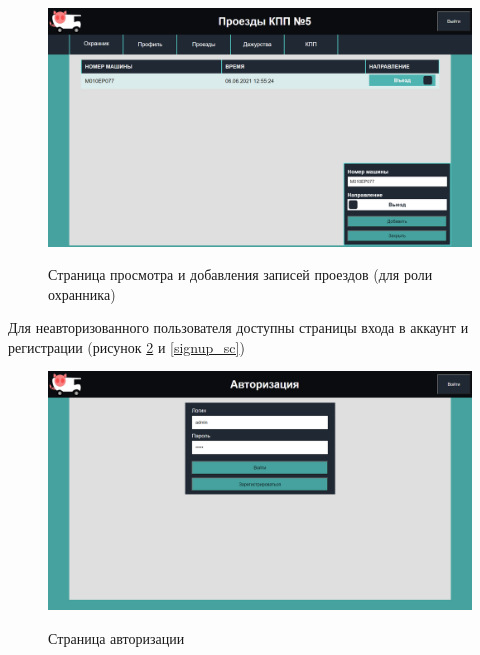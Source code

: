 \begin{figure}[h!] 
	\begin{center}
		{\includegraphics[scale=0.4, angle=0]{sc/pass_guard}}
		\caption{Страница просмотра и добавления записей проездов (для роли охранника)}
		\label{pass_guard_sc}
	\end{center}
\end{figure}

\newpage
Для неавторизованного пользователя доступны страницы входа в аккаунт и регистрации (рисунок \ref{login_sc} и \ref{signup_sc}) 

\begin{figure}[h!] 
	\begin{center}
		{\includegraphics[scale=0.38, angle=0]{sc/login}}
		\caption{Страница авторизации}
		\label{login_sc}
	\end{center}
\end{figure}

